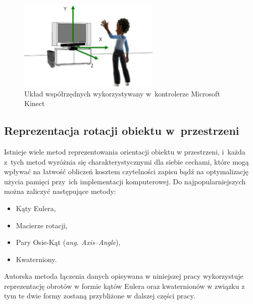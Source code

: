 \begin{savenotes}
	\begin{figure}
		\centering
		\includegraphics[width=0.6\textwidth]{images/skeletonSpace.png}
		\caption[Układ współrzędnych wykorzystywany w~kontrolerze Microsoft Kinect]{Układ współrzędnych wykorzystywany w~kontrolerze Microsoft Kinect }
		\label{fig:characteristics:kinect:space}
	\end{figure}
\end{savenotes}
																											
																									
\subsection{Reprezentacja rotacji obiektu w~przestrzeni}\label{chap:orientstionRep}
Istnieje wiele metod reprezentowania orientacji obiektu w przestrzeni, i~każda z~tych metod wyróżnia się charakterystycznymi dla siebie cechami, które mogą wpływać na łatwość obliczeń kosztem czytelności zapisu bądź na optymalizację użycia pamięci przy~ich implementacji komputerowej. Do najpopularniejszych można zaliczyć następujące metody:
																										
\begin{itemize}
	\item Kąty Eulera,
	\item Macierze rotacji,
	\item Pary Osie-Kąt (\emph{ang. Axis--Angle}),
	\item Kwaterniony.
\end{itemize} 
				
Autorska metoda łączenia danych opisywana w niniejszej pracy wykorzystuje reprezentację obrotów w formie kątów Eulera oraz kwaternionów w związku z tym te dwie formy zostaną przybliżone w dalszej części pracy.
																											
